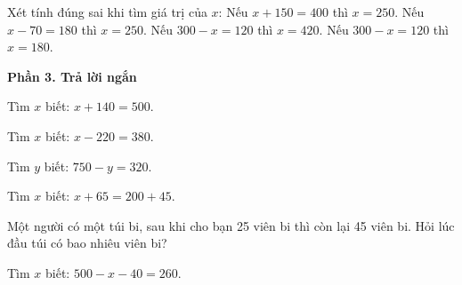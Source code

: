 \begin{ex} %
Xét tính đúng sai khi tìm giá trị của $x$:
\choiceTF
{\True Nếu $x + 150 = 400$ thì $x = 250$.}
{\True Nếu $x - 70 = 180$ thì $x = 250$.}
{Nếu $300 - x = 120$ thì $x = 420$.}
{\True Nếu $300 - x = 120$ thì $x = 180$.}
\end{ex}

\textbf{Phần 3. Trả lời ngắn}

\begin{ex} %
Tìm $x$ biết: $x + 140 = 500$.
\end{ex}

\begin{ex} %
Tìm $x$ biết: $x - 220 = 380$.
\end{ex}

\begin{ex} %
Tìm $y$ biết: $750 - y = 320$.
\end{ex}

\begin{ex} %
Tìm $x$ biết: $x + 65 = 200 + 45$.
\end{ex}

\begin{ex} %
Một người có một túi bi, sau khi cho bạn 25 viên bi thì còn lại 45 viên bi. Hỏi lúc đầu túi có bao nhiêu viên bi?
\end{ex}

\begin{ex} %
Tìm $x$ biết: $500 - x - 40 = 260$.
\end{ex}
